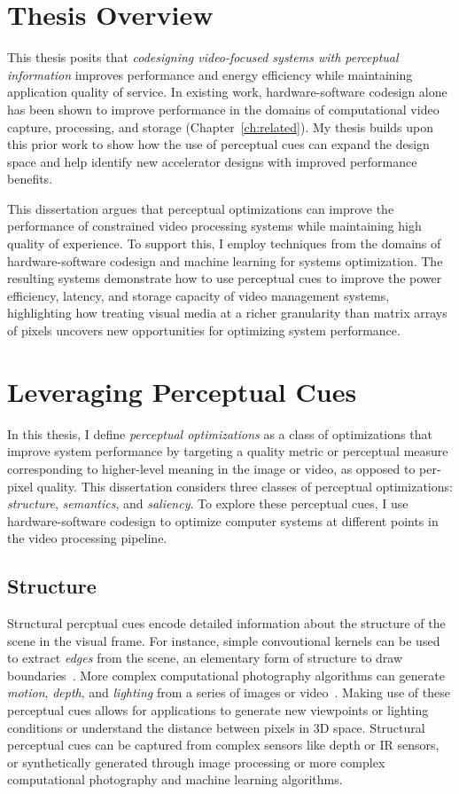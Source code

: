 \section{Thesis Overview}
This thesis posits that \emph{codesigning video-focused systems with perceptual information} improves performance and energy efficiency while maintaining application quality of service.
In existing work, hardware-software codesign alone has been shown to improve performance in the domains of computational video capture, processing, and storage (Chapter~\ref{ch:related}).
My thesis builds upon this prior work to show how the use of perceptual cues can expand the design space and help identify new accelerator designs with improved performance benefits.

This dissertation argues that perceptual optimizations can improve the performance of constrained video processing systems while maintaining high quality of experience.
To support this, I employ techniques from the domains of hardware-software codesign and machine learning for systems optimization.
The resulting systems demonstrate how to use perceptual cues to improve the power efficiency, latency, and storage capacity of video management systems, highlighting how treating visual media at a richer granularity than matrix arrays of pixels uncovers new opportunities for optimizing system performance.

\section{Leveraging Perceptual Cues}
In this thesis, I define \textit{perceptual optimizations} as a class of optimizations that improve system performance by targeting a quality metric or perceptual measure corresponding to higher-level meaning in the image or video, as opposed to per-pixel quality.
This dissertation considers three classes of perceptual optimizations: \textit{structure}, \textit{semantics}, and \textit{saliency}. To explore these perceptual cues, I use hardware-software codesign to optimize computer systems at different points in the video processing pipeline.

\subsection{Structure}
Structural percptual cues encode detailed information about the structure of the  scene in the visual frame.
For instance, simple convoutional kernels can be used to extract \emph{edges} from the scene, an elementary form of structure to draw boundaries~\cite{FFLS2008}.
More complex computational photography algorithms can generate \emph{motion}, \emph{depth}, and \emph{lighting} from a series of images or video~\cite{optical-flow, googlejump, Barron2015A}.
Making use of these perceptual cues allows for applications to generate new viewpoints or lighting conditions or understand the distance between pixels in 3D space.
Structural perceptual cues can be captured from complex sensors like depth or IR sensors, or synthetically generated through image processing or more complex computational photography and machine learning algorithms.

